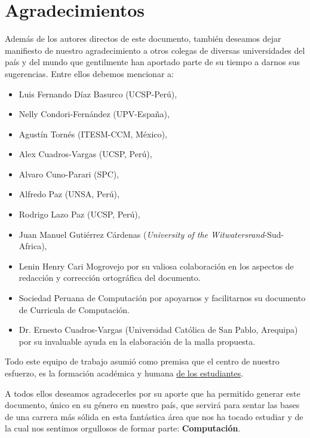 \chapter*{Agradecimientos}\label{chap:cs-ack}
%

Además de los autores directos de este documento, también deseamos dejar manifiesto de nuestro 
agradecimiento a otros colegas de diversas universidades del país y del mundo que gentilmente 
han aportado parte de su tiempo a darnos sus sugerencias. Entre ellos debemos mencionar a:

\begin{itemize}
\item Luis Fernando Díaz Basurco (UCSP-Perú), 
\item Nelly Condori-Fernández (UPV-España), 
\item Agustín Tornés (ITESM-CCM, México), 
\item Alex Cuadros-Vargas (UCSP, Perú),
\item Alvaro Cuno-Parari (SPC),
\item Alfredo Paz (UNSA, Perú), 
\item Rodrigo Lazo Paz (UCSP, Perú),
\item Juan Manuel Gutiérrez Cárdenas (\textit{University of the Witwatersrand}-Sud-Africa),
\item Lenin Henry Cari Mogrovejo por su valiosa colaboración en los aspectos de redacción y corrección ortográfica del documento.

\item Sociedad Peruana de Computación por apoyarnos y facilitarnos su documento de Curricula de Computación.
\item Dr. Ernesto Cuadros-Vargas (Universidad Católica de San Pablo, Arequipa) por su invaluable ayuda en la elaboración de la malla propuesta. 
\end{itemize}

Todo este equipo de trabajo asumió como premisa que el centro de nuestro esfuerzo, 
es la formación académica y humana \underline{de los estudiantes}.

A todos ellos deseamos agradecerles por su aporte que ha permitido generar 
este documento, único en su género en nuestro país, que servirá para sentar las 
bases de una carrera más sólida en esta fantástica área que nos ha tocado estudiar y 
de la cual nos sentimos orgullosos de formar parte: \textbf{Computación}.
